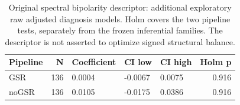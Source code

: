 \begin{table}[htbp]
\centering\small
\caption{Original spectral bipolarity descriptor: additional exploratory raw adjusted diagnosis models. Holm covers the two pipeline tests, separately from the frozen inferential families. The descriptor is not asserted to optimize signed structural balance.}\label{tab:Slegacy}
\begin{tabular}{lrlllr}
\toprule
Pipeline & N & Coefficient & CI low & CI high & Holm p \\
\midrule
GSR & 136 & 0.0004 & -0.0067 & 0.0075 & 0.916 \\
noGSR & 136 & 0.0105 & -0.0175 & 0.0386 & 0.916 \\
\bottomrule
\end{tabular}
\end{table}
